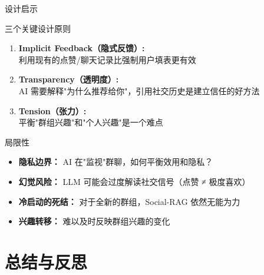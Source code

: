 \documentclass[UTF8,aspectratio=169]{ctexbeamer}
\begin{document}
\begin{frame}{设计启示}
\begin{block}{三个关键设计原则}
\begin{enumerate}
\item \textbf{Implicit Feedback（隐式反馈）:} \\
  利用现有的点赞/聊天记录比强制用户填表更有效

\vspace{0.2cm}

\item \textbf{Transparency（透明度）:} \\
  AI 需要解释"为什么推荐给你"，引用社交历史是建立信任的好方法

\vspace{0.2cm}

\item \textbf{Tension（张力）:} \\
  平衡"群组兴趣"和"个人兴趣"是一个难点
\end{enumerate}
\end{block}
\end{frame}

\begin{frame}{局限性}
\begin{itemize}
\item \textbf{隐私边界：} AI 在"监视"群聊，如何平衡效用和隐私？
\item \textbf{幻觉风险：} LLM 可能会过度解读社交信号（点赞 ≠ 极度喜欢）
\item \textbf{冷启动的死结：} 对于全新的群组，Social-RAG 依然无能为力
\item \textbf{兴趣转移：} 难以及时反映群组兴趣的变化
\end{itemize}
\end{frame}

\section{总结与反思}
\end{document}
